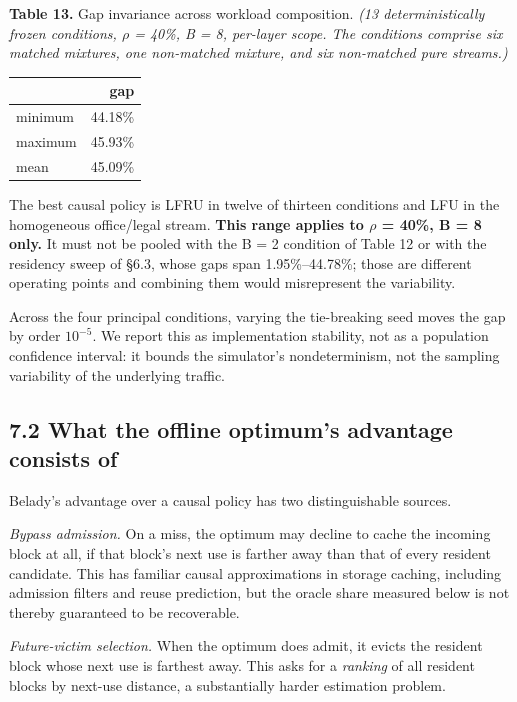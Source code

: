 \documentclass[
  10pt,
  letterpaper,
  10pt]{article}
\newcounter{none} %
\begin{document}
\textbf{Table 13.} Gap invariance across workload composition. \emph{(13
deterministically frozen conditions, \(\rho\) = 40\%, B = 8, per-layer
scope. The conditions comprise six matched mixtures, one non-matched
mixture, and six non-matched pure streams.)}

{\def\LTcaptype{none} %
\begin{longtable}[]{@{}lr@{}}
\toprule\noalign{}
& gap \\
\midrule\noalign{}
\endhead
\bottomrule\noalign{}
\endlastfoot
minimum & 44.18\% \\
maximum & 45.93\% \\
mean & 45.09\% \\
\end{longtable}
}

The best causal policy is LFRU in twelve of thirteen conditions and LFU
in the homogeneous office/legal stream. \textbf{This range applies to
\(\rho\) = 40\%, B = 8 only.} It must not be pooled with the B = 2
condition of Table 12 or with the residency sweep of §6.3, whose gaps
span 1.95\%--44.78\%; those are different operating points and combining
them would misrepresent the variability.

Across the four principal conditions, varying the tie-breaking seed
moves the gap by order \(10^{-5}\). We report this as implementation
stability, not as a population confidence interval: it bounds the
simulator's nondeterminism, not the sampling variability of the
underlying traffic.

\subsection{7.2 What the offline optimum's advantage consists
of}\label{what-the-offline-optimums-advantage-consists-of}

Belady's advantage over a causal policy has two distinguishable sources.

\emph{Bypass admission.} On a miss, the optimum may decline to cache the
incoming block at all, if that block's next use is farther away than
that of every resident candidate. This has familiar causal
approximations in storage caching, including admission filters and reuse
prediction, but the oracle share measured below is not thereby
guaranteed to be recoverable.

\emph{Future-victim selection.} When the optimum does admit, it evicts
the resident block whose next use is farthest away. This asks for a
\emph{ranking} of all resident blocks by next-use distance, a
substantially harder estimation problem.
\end{document}
